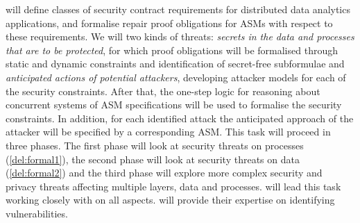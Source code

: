 \begin{Workpackage}{\thewpno}
\begin{Task}
\TaskResults{%
\ref{del:formal1},
\ref{del:formal2},
\ref{del:formal3}
}
\TaskHeader{}


\theTask{} will define classes of security contract requirements for distributed data analytics applications, and formalise repair proof obligations for ASMs with respect to these requirements. We will two kinds of threats: \emph{secrets in the data and processes that are to be protected}, for which proof obligations will be formalised through static and dynamic constraints and identification of secret-free subformulae and \emph{anticipated actions of potential attackers}, developing attacker models for each of the security constraints. After that, the one-step logic for reasoning about concurrent systems of ASM specifications will be used to formalise the security constraints. In addition, for each identified attack the anticipated approach of the attacker will be specified by a corresponding ASM. This task will proceed in three phases. The first phase will look at security threats on processes (\ref{del:formal1}), the second phase will look at security threats on data (\ref{del:formal2}) and the third phase will explore more complex security and privacy threats affecting multiple layers, data and processes. \SCCHshort will lead this task working closely with \SA on all aspects. \IBMshort will provide their expertise on identifying vulnerabilities.


\end{Task}
\end{Workpackage}
